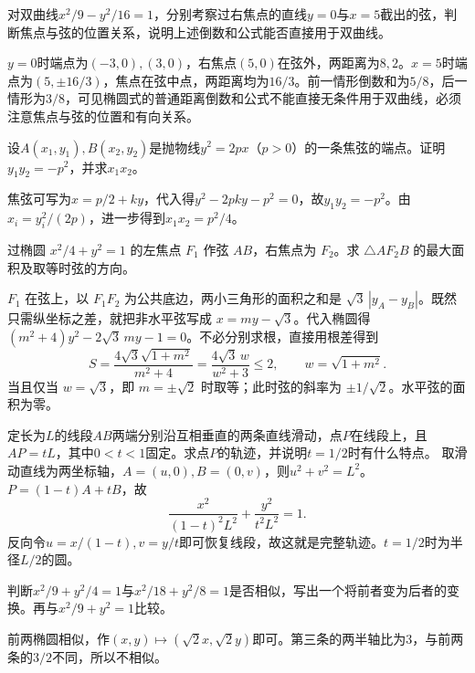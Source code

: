 对双曲线\(x^2/9-y^2/16=1\)，分别考察过右焦点的直线\(y=0\)与\(x=5\)截出的弦，判断焦点与弦的位置关系，说明上述倒数和公式能否直接用于双曲线。
\par
\solutionanswer
\(y=0\)时端点为\((-3,0),(3,0)\)，右焦点\((5,0)\)在弦外，两距离为\(8,2\)。\(x=5\)时端点为\((5,\pm16/3)\)，焦点在弦中点，两距离均为\(16/3\)。前一情形倒数和为\(5/8\)，后一情形为\(3/8\)，可见椭圆式的普通距离倒数和公式不能直接无条件用于双曲线，必须注意焦点与弦的位置和有向关系。


设\(A(x_1,y_1),B(x_2,y_2)\)是抛物线\(y^2=2px\)（\(p>0\)）的一条焦弦的端点。证明\(y_1y_2=-p^2\)，并求\(x_1x_2\)。
\par
\solutionanswer
焦弦可写为\(x=p/2+ky\)，代入得\(y^2-2pky-p^2=0\)，故\(y_1y_2=-p^2\)。由\(x_i=y_i^2/(2p)\)，进一步得到\(x_1x_2=p^2/4\)。


过椭圆 \(x^2/4+y^2=1\) 的左焦点 \(F_1\) 作弦 \(AB\)，右焦点为 \(F_2\)。求 \(\triangle AF_2B\) 的最大面积及取等时弦的方向。
\par
\solutionanswer
\(F_1\) 在弦上，以 \(F_1F_2\) 为公共底边，两小三角形的面积之和是 \(\sqrt3\,|y_A-y_B|\)。既然只需纵坐标之差，就把非水平弦写成 \(x=my-\sqrt3\)。代入椭圆得 \((m^2+4)y^2-2\sqrt3\,my-1=0\)。不必分别求根，直接用根差得到
\[
 S=\frac{4\sqrt3\sqrt{1+m^2}}{m^2+4}
   =\frac{4\sqrt3\,w}{w^2+3}\le2,\qquad w=\sqrt{1+m^2}.
\]
当且仅当 \(w=\sqrt3\)，即 \(m=\pm\sqrt2\) 时取等；此时弦的斜率为 \(\pm1/\sqrt2\)。水平弦的面积为零。


定长为\(L\)的线段\(AB\)两端分别沿互相垂直的两条直线滑动，点\(P\)在线段上，且\(AP=tL\)，其中\(0<t<1\)固定。求点\(P\)的轨迹，并说明\(t=1/2\)时有什么特点。
\solutionanswer
取滑动直线为两坐标轴，\(A=(u,0),B=(0,v)\)，则\(u^2+v^2=L^2\)。\(P=(1-t)A+tB\)，故
\[
\frac{x^2}{(1-t)^2L^2}+\frac{y^2}{t^2L^2}=1.
\]
反向令\(u=x/(1-t),v=y/t\)即可恢复线段，故这就是完整轨迹。\(t=1/2\)时为半径\(L/2\)的圆。


判断\(x^2/9+y^2/4=1\)与\(x^2/18+y^2/8=1\)是否相似，写出一个将前者变为后者的变换。再与\(x^2/9+y^2=1\)比较。
\par
\solutionanswer
前两椭圆相似，作\((x,y)\mapsto(\sqrt2x,\sqrt2y)\)即可。第三条的两半轴比为\(3\)，与前两条的\(3/2\)不同，所以不相似。


